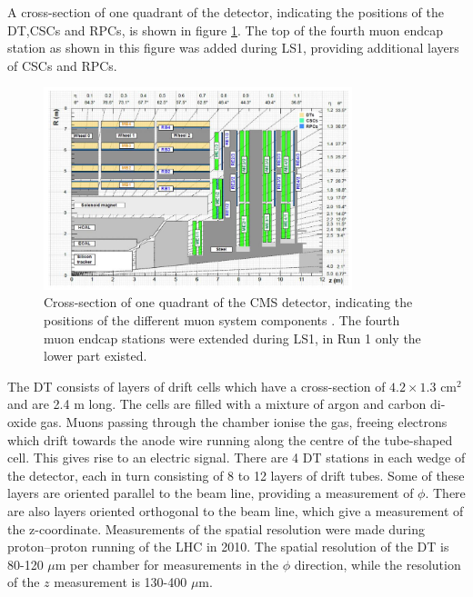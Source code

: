 A cross-section of one quadrant of the detector, indicating
the positions of the \ac{DT},\ac{CSCs} and \ac{RPCs}, is shown in figure \ref{fig:CMS_MuonSystem}.
The top of the fourth muon endcap station as shown in this figure was added during \ac{LS1}, providing
additional layers of \ac{CSCs} and \ac{RPCs}.
\begin{figure}[h!]
\begin{center}
\includegraphics[width=0.8\textwidth]{./Detector/Plots/MuonSystemUpgrade.png}
\caption{Cross-section of one quadrant of the CMS detector, indicating
the positions of the different muon system components \cite{cms-muon-upgrade}. The 
fourth muon endcap stations were extended during \ac{LS1}, in Run 1 only the lower
part existed.}
\label{fig:CMS_MuonSystem}
\end{center}
\end{figure}

The \ac{DT} consists of layers of drift cells which have a cross-section of $4.2 \times 1.3$ cm$^2$ and
are 2.4 m long. The cells are filled with a mixture of %
argon and carbon di-oxide gas.
Muons passing through the chamber ionise the gas, freeing electrons
which drift towards the anode wire running along the centre of the tube-shaped cell. 
This gives rise to an electric signal. There are 4 \ac{DT} stations in each wedge of 
the detector, each in turn consisting of 8 to 12 layers of drift tubes. Some of
these layers are oriented parallel to the beam line, providing a measurement of $\phi$.
There are also layers oriented orthogonal to the beam line, which give a measurement
of the z-coordinate. Measurements of the spatial resolution were made
during proton--proton running of the \ac{LHC} in 2010.
The spatial resolution of the \ac{DT} is 80-120 $\mu$m per chamber for
measurements in the $\phi$ direction, while the resolution of the $z$ measurement
is 130-400 $\mu$m\cite{cms-muon-7tev}.


